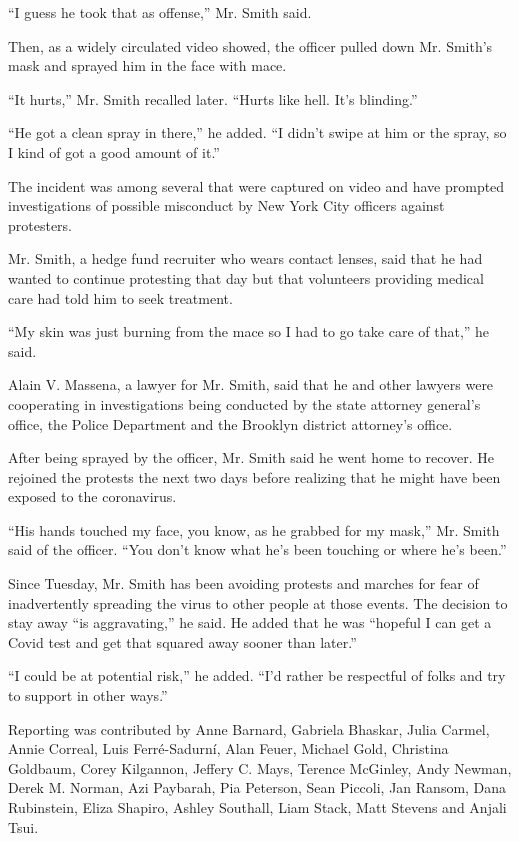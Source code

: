 ``I guess he took that as offense,'' Mr. Smith said.

Then, as a widely circulated video showed, the officer pulled down Mr.
Smith's mask and sprayed him in the face with mace.

``It hurts,'' Mr. Smith recalled later. ``Hurts like hell. It's
blinding.''

``He got a clean spray in there,'' he added. ``I didn't swipe at him or
the spray, so I kind of got a good amount of it.''

The incident was among several that were captured on video and have
prompted investigations of possible misconduct by New York City officers
against protesters.

Mr. Smith, a hedge fund recruiter who wears contact lenses, said that he
had wanted to continue protesting that day but that volunteers providing
medical care had told him to seek treatment.

``My skin was just burning from the mace so I had to go take care of
that,'' he said.

Alain V. Massena, a lawyer for Mr. Smith, said that he and other lawyers
were cooperating in investigations being conducted by the state attorney
general's office, the Police Department and the Brooklyn district
attorney's office.

After being sprayed by the officer, Mr. Smith said he went home to
recover. He rejoined the protests the next two days before realizing
that he might have been exposed to the coronavirus.

``His hands touched my face, you know, as he grabbed for my mask,'' Mr.
Smith said of the officer. ``You don't know what he's been touching or
where he's been.''

Since Tuesday, Mr. Smith has been avoiding protests and marches for fear
of inadvertently spreading the virus to other people at those events.
The decision to stay away ``is aggravating,'' he said. He added that he
was ``hopeful I can get a Covid test and get that squared away sooner
than later.''

``I could be at potential risk,'' he added. ``I'd rather be respectful
of folks and try to support in other ways.''

Reporting was contributed by Anne Barnard, Gabriela Bhaskar, Julia
Carmel, Annie Correal, Luis Ferré-Sadurní, Alan Feuer, Michael Gold,
Christina Goldbaum, Corey Kilgannon, Jeffery C. Mays, Terence McGinley,
Andy Newman, Derek M. Norman, Azi Paybarah, Pia Peterson, Sean Piccoli,
Jan Ransom, Dana Rubinstein, Eliza Shapiro, Ashley Southall, Liam Stack,
Matt Stevens and Anjali Tsui.

